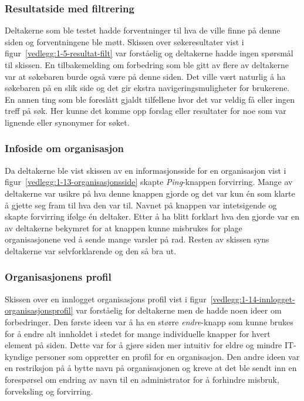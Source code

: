 \subsubsection{Resultatside med filtrering}

Deltakerne som ble testet hadde forventninger til hva de ville finne på denne siden og forventningene ble møtt. 
Skissen over søkeresultater vist i figur~\ref{vedlegg:1-5-resultat-filt} var forståelig og deltakerne hadde ingen spørsmål til skissen.
En tilbakemelding om forbedring som ble gitt av flere av deltakerne var at søkebaren burde også være på denne siden. Det ville vært naturlig å ha søkebaren på en slik side og det gir ekstra navigeringsmuligheter for brukerene. En annen ting som ble foreslått gjaldt tilfellene hvor det var veldig få eller ingen treff på søk. Her kunne det komme opp forslag eller resultater for noe som var lignende eller synonymer for søket.


\subsubsection{Infoside om organisasjon}

Da deltakerne ble vist skissen av en informasjonsside for en organisasjon vist i figur~\ref{vedlegg:1-13-organisasjonsside} skapte {\em  Ping}-knappen forvirring. Mange av deltakerne var usikre på hva denne knappen gjorde og det var kun én som klarte å gjette seg fram til hva den var til. Navnet på knappen var intetsigende og skapte forvirring ifølge én deltaker. Etter å ha blitt forklart hva den gjorde var en av deltakerne bekymret for at knappen kunne misbrukes for plage organisasjonene ved å sende mange varsler på rad. Resten av skissen syns deltakerne var selvforklarende og den så bra ut. 


\subsubsection{Organisasjonens profil}

Skissen over en innlogget organisasjons profil vist i figur~\ref{vedlegg:1-14-innlogget-organisasjonsprofil} var forståelig for deltakerne men de hadde noen ideer om forbedringer. Den første ideen var å ha en større {\em  endre}-knapp som kunne brukes for å endre alt innholdet i stedet for mange individuelle knapper for hvert element på siden. Dette var for å gjøre siden mer intuitiv for eldre og mindre IT-kyndige personer som oppretter en profil for en  organisasjon. Den andre ideen var en restriksjon på å bytte navn på organisasjonen og kreve at det ble sendt inn en forespørsel om endring av navn til en administrator for å forhindre misbruk, forveksling og forvirring.

